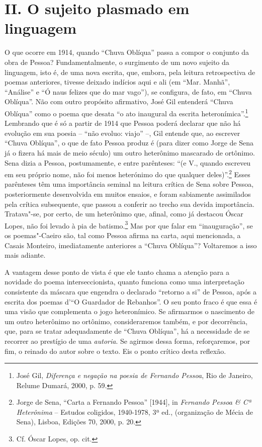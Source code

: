 \section*{II. O sujeito plasmado em linguagem}

O que ocorre em 1914, quando ``Chuva Oblíqua'' passa a compor o conjunto
da obra de Pessoa? Fundamentalmente, o surgimento de um novo sujeito da
linguagem, isto é, de uma nova escrita, que, embora, pela leitura
retrospectiva de poemas anteriores, tivesse deixado indícios aqui e ali
(em ``Mar. Manhã'', ``Análise'' e ``Ó naus felizes que do mar vago''),
se configura, de fato, em ``Chuva Oblíqua''. Não com outro propósito
afirmativo, José Gil entenderá ``Chuva Oblíqua'' como o poema que desata
``o ato inaugural da escrita heteronímica''.\footnote{José Gil,
  \emph{Diferença e negação na poesia de Fernando Pessoa}, Rio de
  Janeiro, Relume Dumará, 2000, p. 59.} Lembrando que é só a partir de
1914 que Pessoa poderá declarar que não há evolução em sua poesia --
``não evoluo: viajo'' --, Gil entende que, ao escrever ``Chuva
Oblíqua'', o que de fato Pessoa produz é (para dizer como Jorge de Sena
já o fizera há mais de meio século) um outro heterônimo mascarado de
ortônimo. Sena dizia a Pessoa, postumamente, e entre parênteses: ``(e
V., quando escreveu em seu próprio nome, não foi menos heterónimo do que
qualquer deles)''.\footnote{Jorge de Sena, ``Carta a Fernando Pessoa''
  {[}1944{]}, in \emph{Fernando Pessoa \& Cª Heterônima} -- Estudos
  coligidos, 1940-1978, 3ª ed., (organização de Mécia de Sena), Lisboa,
  Edições 70, 2000, p. 20.} Esses parênteses têm uma importância seminal
na leitura crítica de Sena sobre Pessoa, posteriormente desenvolvida em
muitos ensaios, e foram sabiamente assimilados pela crítica subsequente,
que passou a conferir ao trecho sua devida importância. Tratava"-se, por
certo, de um heterônimo que, afinal, como já destacou Óscar Lopes, não
foi levado à pia de batismo.\footnote{Cf. Óscar Lopes, op. cit.} Mas por
que falar em ``inauguração'', se os poemas"-Caeiro são, tal como Pessoa
afirma na carta, aqui mencionada, a Casais Monteiro, imediatamente
anteriores a ``Chuva Oblíqua''? Voltaremos a isso mais adiante.

A vantagem desse ponto de vista é que ele tanto chama a atenção para a
novidade do poema interseccionista, quanto funciona como uma
interpretação consistente da máscara que engendra o declarado ``retorno
a si'' de Pessoa, após a escrita dos poemas d'``O Guardador de
Rebanhos''. O seu ponto fraco é que essa é uma visão que complementa o
jogo heteronímico. Se afirmarmos o nascimento de um outro heterônimo no
ortônimo, consideraremos também, e por decorrência, que, para se tratar
adequadamente de ``Chuva Oblíqua'', há a necessidade de se recorrer ao
prestígio de uma \emph{autoria}. Se agirmos dessa forma, reforçaremos,
por fim, o reinado do autor sobre o texto. Eis o ponto crítico desta
reflexão.

